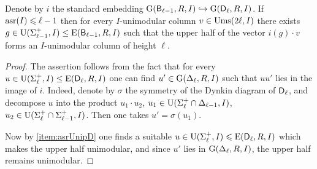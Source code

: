 \begin{cor} \label{cor:embeddingBD}
 Denote by $i$ the standard embedding $\operatorname{G}(\mathsf{B}_{\ell-1}, R, I) \hookrightarrow \operatorname{G}(\mathsf{D}_\ell, R, I)$. 
 If $\operatorname{asr}(I) \leqslant \ell-1$ then for every $I$-unimodular column $v \in \operatorname{Ums}(2\ell, I)$ there exists $g \in \operatorname{U}(\Sigma_{\ell-1}^+, I) \leq \operatorname{E}(\mathsf{B}_{\ell-1}, R, I)$ such that
 the upper half of the vector $i(g) \cdot v$ forms an $I$-unimodular column of height $\ell$.
\end{cor}
\begin{proof}
 The assertion follows from the fact that for every $u \in \operatorname{U}(\Sigma_\ell^+, I) \leq \operatorname{E}(\mathsf{D}_\ell, R, I)$ one can find $u' \in \operatorname{G}(\Delta_\ell, R, I)$ such that $uu'$ lies in the image of $i$. 
 Indeed, denote by $\sigma$ the symmetry of the Dynkin diagram of $\mathsf{D}_\ell$,
 and decompose $u$ into the product $u_1 \cdot u_2$, $u_1 \in \operatorname{U}(\Sigma_\ell^+\cap\Delta_{\ell-1}, I)$, $u_2 \in \operatorname{U}(\Sigma_\ell^+ \cap \Sigma_{\ell-1}^+, I)$.
 Then one takes $u' = \sigma(u_1)$.

 Now by \cref{item:asrUnipD} one finds a suitable $u \in \operatorname{U}(\Sigma_\ell^+, I) \leqslant \operatorname{E}(\mathsf{D}_\ell, R, I)$ which makes the upper half unimodular,
 and since $u'$ lies in $\operatorname{G}(\Delta_\ell, R, I)$, the upper half remains unimodular.
\end{proof}


